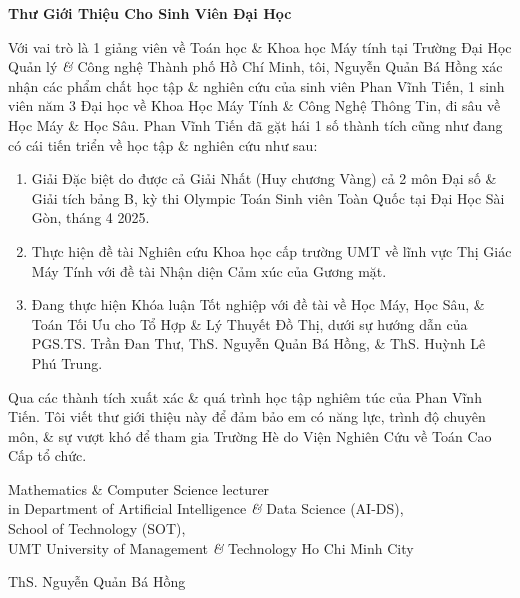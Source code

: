 \documentclass[11pt]{article}
\begin{document}
\begin{center}
    \LARGE
    \textbf{\textsf{Thư Giới Thiệu Cho Sinh Viên Đại Học}}
\end{center}
Với vai trò là 1 giảng viên về Toán học \& Khoa học Máy tính tại Trường Đại Học Quản lý {\it\&} Công nghệ Thành phố Hồ Chí Minh, tôi, {\sc Nguyễn Quản Bá Hồng} xác nhận các phẩm chất học tập \& nghiên cứu của sinh viên {\sc Phan Vĩnh Tiến}, 1 sinh viên năm 3 Đại học về Khoa Học Máy Tính \& Công Nghệ Thông Tin, đi sâu về Học Máy \& Học Sâu. {\sc Phan Vĩnh Tiến} đã gặt hái 1 số thành tích cũng như đang có cái tiến triển về học tập \& nghiên cứu như sau:
\begin{enumerate}
    \item Giải Đặc biệt do được cả Giải Nhất (Huy chương Vàng) cả 2 môn Đại số \& Giải tích bảng B, kỳ thi Olympic Toán Sinh viên Toàn Quốc tại Đại Học Sài Gòn, tháng 4 2025.
    \item Thực hiện đề tài Nghiên cứu Khoa học cấp trường UMT về lĩnh vực Thị Giác Máy Tính với đề tài Nhận diện Cảm xúc của Gương mặt.
    \item Đang thực hiện Khóa luận Tốt nghiệp với đề tài về Học Máy, Học Sâu, \& Toán Tối Ưu cho Tổ Hợp \& Lý Thuyết Đồ Thị, dưới sự hướng dẫn của PGS.TS. {\sc Trần Đan Thư}, ThS. {\sc Nguyễn Quản Bá Hồng}, \& ThS. {\sc Huỳnh Lê Phú Trung}.
\end{enumerate}
Qua các thành tích xuất xác \& quá trình học tập nghiêm túc của {\sc Phan Vĩnh Tiến}. Tôi viết thư giới thiệu này để đảm bảo em có năng lực, trình độ chuyên môn, \& sự vượt khó để tham gia Trường Hè do Viện Nghiên Cứu về Toán Cao Cấp tổ chức.


\begin{flushright}    
    Mathematics \& Computer Science lecturer\\in Department of Artificial Intelligence {\it\&} Data Science (AI-DS),\\School of Technology (SOT),\\UMT University of Management {\it\&} Technology Ho Chi Minh City
    
    ThS. {\sc Nguyễn Quản Bá Hồng}
\end{flushright}


\printbibliography[heading=bibintoc]
\end{document}
